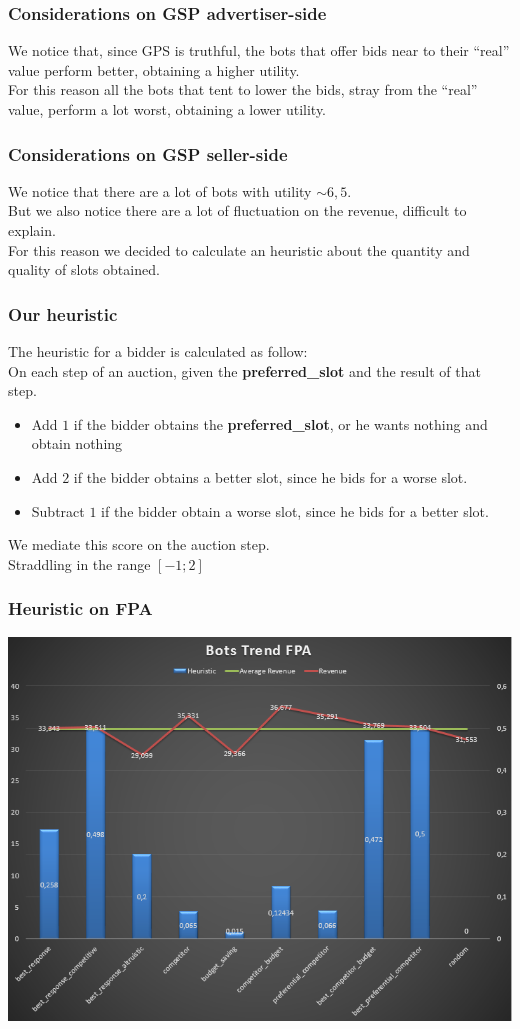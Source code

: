 \documentclass{beamer}
\begin{document}
\begin{frame}
\frametitle{Considerations on GSP advertiser-side}
We notice that, since GPS is truthful, the bots that offer bids near to their ``real'' value perform \alert{better}, obtaining a higher utility.\\
\medskip
For this reason all the bots that tent to lower the bids, stray from the ``real'' value, perform a lot \alert{worst}, obtaining a lower utility. 
\end{frame}


\begin{frame}
\frametitle{Considerations on GSP seller-side}
We notice that there are a lot of bots with utility $\sim6,5$.\\
\medskip
But we also notice there are a lot of fluctuation on the revenue, difficult to explain.\\
\bigskip
For this reason we decided to calculate an heuristic about the quantity and quality of slots obtained.
\end{frame}

\begin{frame}
\frametitle{Our heuristic}
The heuristic for a bidder is calculated as follow:\\
\medskip
On each step of an auction, given the \textbf{preferred\_slot} and the result of that step.
\begin{itemize}
\item Add $1$ if the bidder obtains the \textbf{preferred\_slot}, or he wants nothing and obtain nothing 
\item Add $2$ if the bidder obtains a better slot, since he bids for a worse slot.
\item Subtract $1$ if the bidder obtain a worse slot, since he bids for a better slot.
\end{itemize}
We mediate this score on the auction step.
\\Straddling in the range $ [-1;2]$
\end{frame}


\begin{frame}
\frametitle{Heuristic on FPA}
\begin{center}
\includegraphics[scale=0.46]{img/Auctions/FPA_all_Heuristic.PNG} 
\end{center}
\end{frame}
\end{document}
